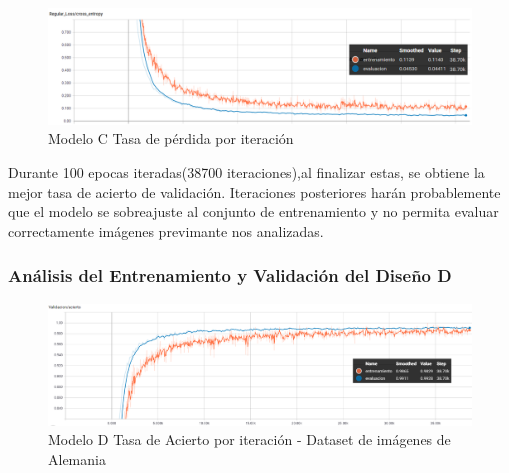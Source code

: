 			
			\begin{figure}[H]
				\begin{center}
				\includegraphics[width=1\textwidth]{images/desarrollo/trainResults/german/model4Loss} 
				\end{center}
				\begin{center}
				\caption{\small{Modelo C Tasa de pérdida por iteración}}
				
				{\small{\fontsize{10}{16.8}\selectfont {Fuente: Elaboración propia}}}
				\end{center}
				\vspace{-1.5em}
			\end{figure}

			Durante 100 epocas iteradas(38700 iteraciones),al finalizar estas, se obtiene la mejor tasa de acierto de validación. Iteraciones posteriores harán probablemente que el modelo se sobreajuste al conjunto de entrenamiento y no permita evaluar correctamente imágenes previmante nos analizadas.

		\subsubsection{Análisis del Entrenamiento y Validación del Diseño D} 
			\begin{figure}[H]
				\begin{center}
				\includegraphics[width=1\textwidth]{images/desarrollo/trainResults/german/model6Acierto} 
				\end{center}
				\begin{center}
				\caption{\small{Modelo D Tasa de Acierto por iteración - Dataset de imágenes de Alemania  }}
				
				{\small{\fontsize{10}{16.8}\selectfont {Fuente: Elaboración propia}}}
				\end{center}
				\vspace{-1.5em}
			\end{figure}
			
